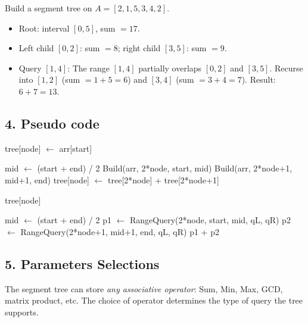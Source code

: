 \begin{example}
\label{ex:st_query}
Build a segment tree on $A = [2, 1, 5, 3, 4, 2]$.
\begin{itemize}
    \item Root: interval $[0,5]$, sum $= 17$.
    \item Left child $[0,2]$: sum $= 8$; right child $[3,5]$: sum $= 9$.
    \item Query $[1,4]$: The range $[1,4]$ partially overlaps $[0,2]$ and $[3,5]$. Recurse into $[1,2]$ (sum $= 1+5=6$) and $[3,4]$ (sum $= 3+4=7$).  Result: $6 + 7 = 13$.
\end{itemize}
\end{example}

\subsection{4. Pseudo code}
\begin{algorithm}
\begin{algorithmic}[1]
\label{alg:st_build}
        \State tree[node] $\gets$ arr[start]
        \State \Return
    \EndIf
        
    \State mid $\gets$ (start + end) / 2
    \State Build(arr, 2*node, start, mid)
    \State Build(arr, 2*node+1, mid+1, end)
    \State tree[node] $\gets$ tree[2*node] + tree[2*node+1]
\EndFunction

\label{alg:st_query}
        \State {} 
    \EndIf
        
        \State \Return tree[node] 
    \EndIf
        
    \State mid $\gets$ (start + end) / 2
    \State p1 $\gets$ RangeQuery(2*node, start, mid, qL, qR)
    \State p2 $\gets$ RangeQuery(2*node+1, mid+1, end, qL, qR)
    \State \Return p1 + p2
\EndFunction
\end{algorithmic}
\end{algorithm}

\subsection{5. Parameters Selections}
\begin{definition}
\label{def:st_operator}
The segment tree can store \emph{any associative operator}: Sum, Min, Max, GCD, matrix product, etc. The choice of operator determines the type of query the tree supports.
\end{definition}

